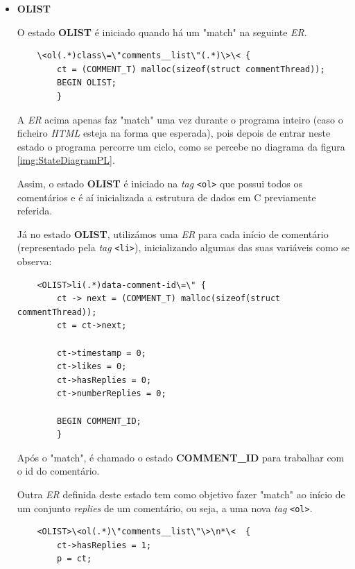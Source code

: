\documentclass[a4paper,12pt]{report}
\newcommand*{\xml}[1]{\texttt{<#1>}}
\begin{document}
\begin{itemize}
    \item 
    \textbf{OLIST}
    \par O estado \textbf{OLIST} é iniciado quando há um "match" na seguinte \textit{ER}.


\begin{verbatim}
    \<ol(.*)class\=\"comments__list\"(.*)\>\< { 
        ct = (COMMENT_T) malloc(sizeof(struct commentThread));
        BEGIN OLIST; 
        }
\end{verbatim}

\par A \textit{ER} acima apenas faz "match" uma vez durante o programa inteiro (caso o ficheiro \textit{HTML} esteja na forma que esperada), pois depois de entrar neste estado o programa percorre um ciclo, como se percebe no diagrama da figura \ref{img:StateDiagramPL}. 
\par Assim, o estado \textbf{OLIST} é iniciado na \textit{tag} \xml{ol} que possui todos os comentários e é aí inicializada a estrutura de dados em C previamente referida.

\vspace{0.5cm}
\par Já no estado \textbf{OLIST}, utilizámos uma \textit{ER} para cada início de comentário (representado pela \textit{tag} \xml{li}), inicializando algumas das suas variáveis como se observa:

\begin{verbatim}
    <OLIST>li(.*)data-comment-id\=\" {  
        ct -> next = (COMMENT_T) malloc(sizeof(struct commentThread));
        ct = ct->next;

        ct->timestamp = 0;
        ct->likes = 0;
        ct->hasReplies = 0;
        ct->numberReplies = 0;

        BEGIN COMMENT_ID;
        }
\end{verbatim}

\par Após o "match", é chamado o estado \textbf{COMMENT\_ID} para trabalhar com o id do comentário.

\vspace{10cm}

\par Outra \textit{ER} definida deste estado tem como objetivo fazer "match" ao início de um conjunto \textit{replies} de um comentário, ou seja, a uma nova \textit{tag} \xml{ol}.

\begin{verbatim}
    <OLIST>\<ol(.*)\"comments__list\"\>\n*\<  {  
        ct->hasReplies = 1;
        p = ct;


\end{verbatim}
\end{itemize}
\end{document}
